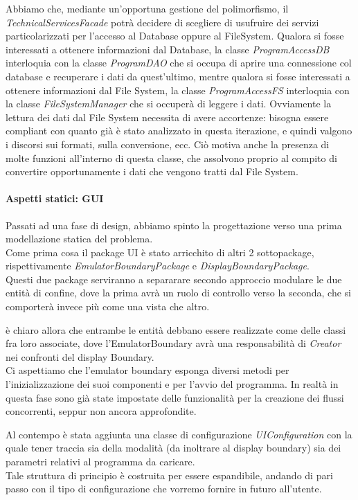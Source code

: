 \documentclass[11pt]{article}
\begin{document}
Abbiamo che, mediante un'opportuna gestione del polimorfismo, il \emph{TechnicalServicesFacade} potrà decidere di scegliere di usufruire dei servizi particolarizzati per l'accesso al Database oppure al FileSystem. Qualora si fosse interessati a ottenere informazioni dal Database, la classe \emph{ProgramAccessDB} interloquia con la classe \emph{ProgramDAO} che si occupa di aprire una connessione col database e recuperare i dati da quest'ultimo, mentre qualora si fosse interessati a ottenere informazioni dal File System, la classe \emph{ProgramAccessFS} interloquia con la classe \emph{FileSystemManager} che si occuperà di leggere i dati. Ovviamente la lettura dei dati dal File System necessita di avere accortenze: bisogna essere compliant con quanto già è stato analizzato in questa iterazione, e quindi valgono i discorsi sui formati, sulla conversione, ecc. Ciò motiva anche la presenza di molte funzioni all'interno di questa classe, che assolvono proprio al compito di convertire opportunamente i dati che vengono tratti dal File System.
\clearpage
\paragraph{Aspetti statici: GUI }

Passati ad una fase di design, abbiamo spinto la progettazione verso una prima modellazione statica del problema.\\
Come prima cosa il package UI è stato arricchito di altri 2 sottopackage, rispettivamente \emph{EmulatorBoundaryPackage} e \emph{DisplayBoundaryPackage}. \\
Questi due package serviranno a separarare secondo approccio modulare le due entità di confine, dove la prima avrà un ruolo di controllo verso la seconda, che si comporterà invece più come una vista che altro.

è chiaro allora che entrambe le entità debbano essere realizzate come delle classi fra loro associate, dove l'EmulatorBoundary avrà una responsabilità di \emph{Creator} nei confronti del display Boundary.\\
Ci aspettiamo che l'emulator boundary esponga diversi metodi per l'inizializzazione dei suoi componenti e per l'avvio del programma. In realtà in questa fase sono già state impostate delle funzionalità per la creazione dei flussi concorrenti, seppur non ancora approfondite.

Al contempo è stata aggiunta una classe di configurazione \emph{UIConfiguration} con la quale tener traccia sia della modalità (da inoltrare al display boundary) sia dei parametri relativi al programma da caricare.\\
Tale struttura di principio è costruita per essere espandibile, andando di pari passo con il tipo di configurazione che vorremo fornire in futuro all'utente.
\end{document}
